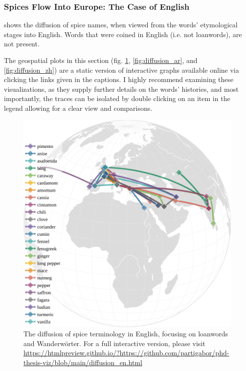 \subsubsection{Spices Flow Into Europe: The Case of English}

 shows the diffusion of spice names, when viewed from the words' etymological stages into English. Words that were coined in English (i.e. not loanwords), are not present.  

\begin{note}
  The geospatial plots in this section (fig. \ref{fig:diffusion_en}, \ref{fig:diffusion_ar}, and \ref{fig:diffusion_zh}) are a static version of interactive graphs available online via clicking the links given in the captions. I highly recommend examining these visualizations, as they supply further details on the words' histories, and most importantly, the traces can be isolated by double clicking on an item in the legend allowing for a clear view and comparisons.
\end{note}

\begin{figure}[ht!]
    \includegraphics[width=\linewidth]{imgs/plots/diffusion_en.pdf}
    \caption{The diffusion of spice terminology in English, focusing on loanwords and Wanderwörter. For a full interactive version, please visit \url{https://htmlpreview.github.io/?https://github.com/partigabor/phd-thesis-viz/blob/main/diffusion_en.html}}
    \label{fig:diffusion_en}
\end{figure}


